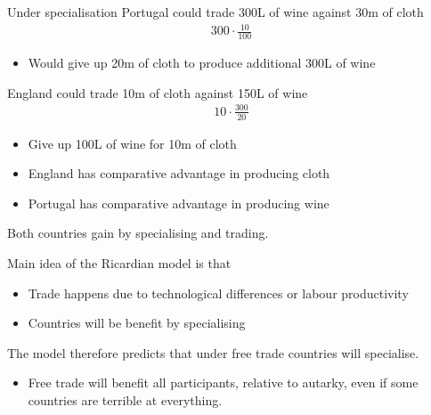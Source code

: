 \documentclass{beamer}
\begin{document}
\begin{frame}
  Under specialisation Portugal could trade 300L of wine against 30m of cloth
  \begin{align*}
    300 \cdotp \frac{10}{100}    
  \end{align*}
  \begin{itemize}
    \item Would give up 20m of cloth to produce additional 300L of wine
  \end{itemize}
  \medskip
  England could trade 10m of cloth against 150L of wine
  \begin{align*}
    10 \cdotp \frac{300}{20}
  \end{align*}
  \begin{itemize}
    \item Give up 100L of wine for 10m of cloth
  \end{itemize}
\end{frame}

\begin{frame}
  \begin{itemize}
    \item England has comparative advantage in producing cloth
    \item Portugal has comparative advantage in producing wine    
  \end{itemize}
  Both countries gain by specialising and trading.
\end{frame}

\begin{frame}
  Main idea of the Ricardian model is that
  \medskip
  \begin{itemize}
    \item Trade happens due to technological differences or labour productivity
    \item Countries will be benefit by specialising
  \end{itemize}
    \medskip   
    The model therefore predicts that under free trade countries will specialise.
    \begin{itemize}
     \item Free trade will benefit all participants, relative to autarky, even if some countries are terrible at everything. 
    \end{itemize}    
\end{frame}
\end{document}
